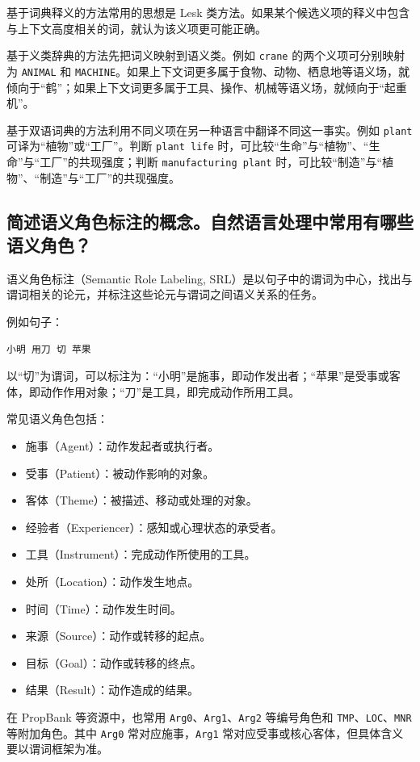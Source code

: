 基于词典释义的方法常用的思想是 Lesk 类方法。如果某个候选义项的释义中包含与上下文高度相关的词，就认为该义项更可能正确。

基于义类辞典的方法先把词义映射到语义类。例如 \texttt{crane} 的两个义项可分别映射为 \texttt{ANIMAL} 和 \texttt{MACHINE}。如果上下文词更多属于食物、动物、栖息地等语义场，就倾向于“鹤”；如果上下文词更多属于工具、操作、机械等语义场，就倾向于“起重机”。

基于双语词典的方法利用不同义项在另一种语言中翻译不同这一事实。例如 \texttt{plant} 可译为“植物”或“工厂”。判断 \texttt{plant life} 时，可比较“生命”与“植物”、“生命”与“工厂”的共现强度；判断 \texttt{manufacturing plant} 时，可比较“制造”与“植物”、“制造”与“工厂”的共现强度。

\subsection{简述语义角色标注的概念。自然语言处理中常用有哪些语义角色？}

语义角色标注（Semantic Role Labeling, SRL）是以句子中的谓词为中心，找出与谓词相关的论元，并标注这些论元与谓词之间语义关系的任务。

例如句子：
\begin{verbatim}
小明 用刀 切 苹果
\end{verbatim}

以“切”为谓词，可以标注为：“小明”是施事，即动作发出者；“苹果”是受事或客体，即动作作用对象；“刀”是工具，即完成动作所用工具。

常见语义角色包括：
\begin{itemize}
  \item 施事（Agent）：动作发起者或执行者。
  \item 受事（Patient）：被动作影响的对象。
  \item 客体（Theme）：被描述、移动或处理的对象。
  \item 经验者（Experiencer）：感知或心理状态的承受者。
  \item 工具（Instrument）：完成动作所使用的工具。
  \item 处所（Location）：动作发生地点。
  \item 时间（Time）：动作发生时间。
  \item 来源（Source）：动作或转移的起点。
  \item 目标（Goal）：动作或转移的终点。
  \item 结果（Result）：动作造成的结果。
\end{itemize}

在 PropBank 等资源中，也常用 \texttt{Arg0}、\texttt{Arg1}、\texttt{Arg2} 等编号角色和 \texttt{TMP}、\texttt{LOC}、\texttt{MNR} 等附加角色。其中 \texttt{Arg0} 常对应施事，\texttt{Arg1} 常对应受事或核心客体，但具体含义要以谓词框架为准。

